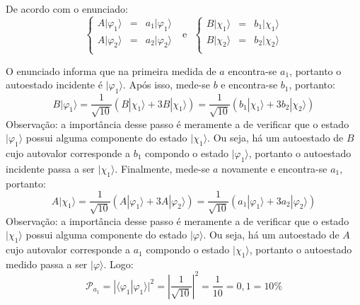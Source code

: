 \begin{enumerate}[start=1,label={\bfseries Q\arabic*.}]
\resposta De acordo com o enunciado:
%
\begin{equation}
  \left\{
    \begin{array}{ccc}
      A | \varphi_{1} \rangle & = & a_{1} | \varphi_{1} \rangle \\
      A | \varphi_{2} \rangle & = & a_{2} | \varphi_{2} \rangle \\
    \end{array}
  \right.
\ \ \  \mbox{e} \ \ \
\left\{
    \begin{array}{ccc}
      B | \chi_{1} \rangle & = & b_{1} | \chi_{1} \rangle \\
      B | \chi_{2} \rangle & = & b_{2} | \chi_{2} \rangle \\
    \end{array}
  \right.
\end{equation}

O enunciado informa que na primeira medida de $a$ encontra-se $a_{1}$, portanto o autoestado incidente é $| \varphi_{1} \rangle$. Após isso, mede-se $b$ e encontra-se $b_{1}$, portanto:
%
\begin{equation}
  B | \varphi_{1} \rangle = \frac{1}{\sqrt{10}} (B | \chi_{1} \rangle + 3 B | \chi_{1} \rangle) = \frac{1}{\sqrt{10}} (b_{1} | \chi_{1} \rangle + 3 b_{2} | \chi_{2} \rangle )
\end{equation}
%
Observação: a importância desse passo é meramente a de verificar que o estado $| \varphi_{1} \rangle $ possui alguma componente do estado $| \chi_{1} \rangle $. Ou seja, há um autoestado de $B$ cujo autovalor corresponde a $b_{1}$ compondo o estado $| \varphi_{1} \rangle $, portanto o autoestado incidente passa a ser $| \chi_{1} \rangle $. Finalmente, mede-se $a$ novamente e encontra-se $a_{1}$, portanto:
%
\begin{equation}
  A | \chi_{1} \rangle = \frac{1}{\sqrt{10}} ( A | \varphi_{1} \rangle + 3 A | \varphi_{2} \rangle ) = \frac{1}{\sqrt{10}} (a_{1} | \varphi_{1} \rangle + 3 a_{2} | \varphi_{2} \rangle)
\end{equation}
%
Observação: a importância desse passo é meramente a de verificar que o estado $ | \chi_{1} \rangle $ possui alguma componente do estado $| \varphi \rangle $. Ou seja, há um autoestado de $A$ cujo autovalor corresponde a $a_{1}$ compondo o estado $ | \chi_{1} \rangle $, portanto o autoestado medido passa a ser $ | \varphi \rangle $. Logo:
%
\begin{equation}
  \mathcal{P}_{a_{1}} = | \langle \varphi_{1} | \varphi_{1} \rangle |^{2} = \left| \frac{1}{\sqrt{10}} \right|^{2} = \frac{1}{10} = 0,1 = 10\%
\end{equation}
%



\end{enumerate}

